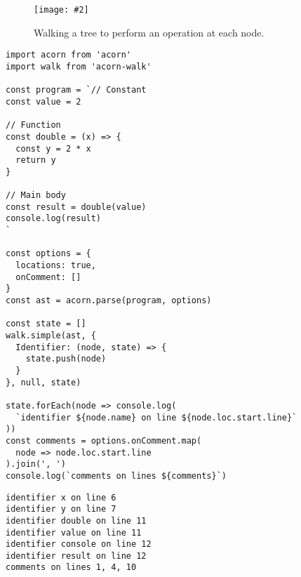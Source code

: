 \documentclass[krantzl]{krantz}
\newcommand{\figpdf}[4]{\begin{figure}%
\centering%
\texttt{[image: \#2]}%
\caption{#3}%
\label{#1}%
\end{figure}}
\begin{document}
\figpdf{style-checker-walk-tree}{./style-checker/walk-tree.pdf}{Walking a tree to perform an operation at each node.}{0.6}


\begin{lstlisting}[frame=single,frameround=tttt]
import acorn from 'acorn'
import walk from 'acorn-walk'

const program = `// Constant
const value = 2

// Function
const double = (x) => {
  const y = 2 * x
  return y
}

// Main body
const result = double(value)
console.log(result)
`

const options = {
  locations: true,
  onComment: []
}
const ast = acorn.parse(program, options)

const state = []
walk.simple(ast, {
  Identifier: (node, state) => {
    state.push(node)
  }
}, null, state)

state.forEach(node => console.log(
  `identifier ${node.name} on line ${node.loc.start.line}`
))
const comments = options.onComment.map(
  node => node.loc.start.line
).join(', ')
console.log(`comments on lines ${comments}`)
\end{lstlisting}



\begin{lstlisting}[frame=single,frameround=tttt]
identifier x on line 6
identifier y on line 7
identifier double on line 11
identifier value on line 11
identifier console on line 12
identifier result on line 12
comments on lines 1, 4, 10
\end{lstlisting}
\end{document}
